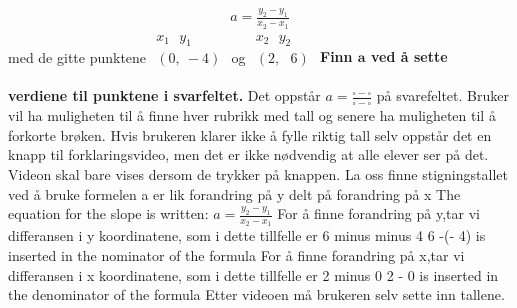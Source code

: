 \documentclass[12pt,twoside,onecolumn]{article}
\begin{document}
\begin{Exercise}
\begin{enumerate}
\begin{align}
a =  \frac{y_2 - y_1}{x_2 - x_1}
\end{align}
med de gitte punktene
$
\begin{matrix}
  x_1\:\:\: y_1 \\ 
 (0,\:-4) \\
\phantom{0}
\end{matrix}
$ og $
\begin{matrix}
  x_2\:\:\: y_2 \\ 
 (2,\:\:\:6)  \\
\phantom{0}
\end{matrix}
$ 
\newline
\textbf{Finn $\mathbf{a}$ ved å sette verdiene til punktene i svarfeltet.}
\newline
\newline
{\color{Maroon} Det oppstår $a=\frac{\square-\square}{\square-\square}$ på svarefeltet. Bruker vil ha muligheten til å finne hver rubrikk med tall og senere ha muligheten til å forkorte brøken. Hvis brukeren klarer ikke å fylle riktig tall selv oppstår det en knapp til  forklaringsvideo, men det er ikke nødvendig at alle elever ser på det. Videon skal bare vises  dersom de trykker på knappen.}
\newline
\newline
{\color{gray} La oss finne stigningstallet ved å bruke formelen a er lik forandring på y delt på forandring på x } \newline
{\color{PineGreen} The equation for the slope is written: $a =  \frac{y_2 - y_1}{x_2 - x_1}$ } \newline
{\color{gray}  For å finne forandring på y,tar vi differansen i y koordinatene, som i dette tillfelle er 6 minus minus 4 } \newline
{\color{PineGreen}  6 -(- 4) is inserted in the nominator of the formula} \newline
{\color{gray}  For å finne forandring på x,tar vi differansen i x koordinatene, som i dette tillfelle er 2 minus 0 } \newline
{\color{PineGreen} 2 - 0 is inserted in the denominator of the formula  } \newline
{\color{Maroon}  Etter videoen må brukeren selv sette inn tallene.}


\end{enumerate}
\end{Exercise}
\end{document}
